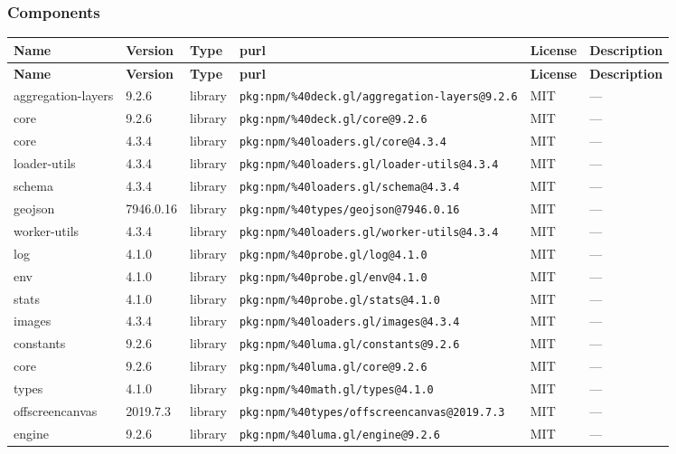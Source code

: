 \documentclass[11pt]{article}
\begin{document}
\subsubsection*{Components}
\begin{longtable}{|l|l|l|p{2.2cm}|l|p{4cm}|}
\hline
\textbf{Name} & \textbf{Version} & \textbf{Type} & \textbf{purl} & \textbf{License} & \textbf{Description} \\
\hline
\endfirsthead
\hline
\textbf{Name} & \textbf{Version} & \textbf{Type} & \textbf{purl} & \textbf{License} & \textbf{Description} \\
\hline
\endhead
aggregation-layers & 9.2.6 & library & \texttt{pkg:npm/\%40deck.gl/aggregation-layers@9.2.6} & MIT & — \\
core & 9.2.6 & library & \texttt{pkg:npm/\%40deck.gl/core@9.2.6} & MIT & — \\
core & 4.3.4 & library & \texttt{pkg:npm/\%40loaders.gl/core@4.3.4} & MIT & — \\
loader-utils & 4.3.4 & library & \texttt{pkg:npm/\%40loaders.gl/loader-utils@4.3.4} & MIT & — \\
schema & 4.3.4 & library & \texttt{pkg:npm/\%40loaders.gl/schema@4.3.4} & MIT & — \\
geojson & 7946.0.16 & library & \texttt{pkg:npm/\%40types/geojson@7946.0.16} & MIT & — \\
worker-utils & 4.3.4 & library & \texttt{pkg:npm/\%40loaders.gl/worker-utils@4.3.4} & MIT & — \\
log & 4.1.0 & library & \texttt{pkg:npm/\%40probe.gl/log@4.1.0} & MIT & — \\
env & 4.1.0 & library & \texttt{pkg:npm/\%40probe.gl/env@4.1.0} & MIT & — \\
stats & 4.1.0 & library & \texttt{pkg:npm/\%40probe.gl/stats@4.1.0} & MIT & — \\
images & 4.3.4 & library & \texttt{pkg:npm/\%40loaders.gl/images@4.3.4} & MIT & — \\
constants & 9.2.6 & library & \texttt{pkg:npm/\%40luma.gl/constants@9.2.6} & MIT & — \\
core & 9.2.6 & library & \texttt{pkg:npm/\%40luma.gl/core@9.2.6} & MIT & — \\
types & 4.1.0 & library & \texttt{pkg:npm/\%40math.gl/types@4.1.0} & MIT & — \\
offscreencanvas & 2019.7.3 & library & \texttt{pkg:npm/\%40types/offscreencanvas@2019.7.3} & MIT & — \\
engine & 9.2.6 & library & \texttt{pkg:npm/\%40luma.gl/engine@9.2.6} & MIT & — \\

\end{longtable}
\end{document}

